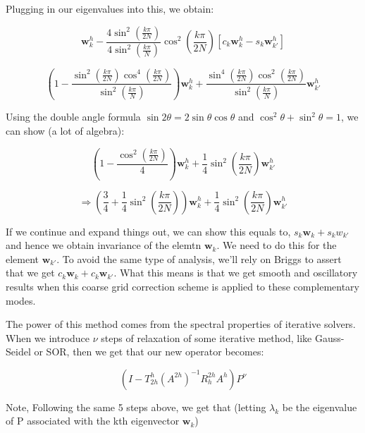 \documentclass[pdftex,12pt,a4paper]{article}
\begin{document}
Plugging in our eigenvalues into this, we obtain: 

\begin{equation}
\mathbf{w}_k^h  - \frac{4 \sin^2 \left( \frac{k \pi}{2N} \right)}{4 \sin^2 \left( \frac{k \pi}{N} \right)} \cos^2\left( \frac{k \pi}{2N}\right) \left[ c_k \mathbf{w}_k^h - s_k \mathbf{w}_{k'}^h \right]
\end{equation}

\begin{equation}
\left(1 - \frac{ \sin^2 \left( \frac{k \pi}{2N} \right) \cos^4\left( \frac{k \pi}{2N}\right) }{ \sin^2 \left( \frac{k \pi}{N} \right)}  \right)\mathbf{w}_k^h  + \frac{ \sin^4 \left( \frac{k \pi}{2N} \right) \cos^2\left( \frac{k \pi}{2N}\right) }{ \sin^2 \left( \frac{k \pi}{N} \right) }  \mathbf{w}_{k'}^h
\end{equation}

Using the double angle formula  $\sin 2 \theta = 2\sin \theta \cos \theta $ and $\cos^2 \theta + \sin^2 \theta = 1$, we can show (a lot of algebra): 

$$
\left( 1 -  \frac{\cos^2 \left( \frac{k \pi}{2N}\right)}{4} \right) \mathbf{w}_k^h + \frac 1 4 \sin^2 \left( \frac{k \pi}{2N} \right) \mathbf{w}_{k'}^h
$$

$$\Rightarrow
\left( \frac 3 4 + \frac 1 4 \sin^2\left( \frac{k \pi}{2N}\right) \right) \mathbf{w}_k^h + \frac 1 4 \sin^2 \left( \frac{k \pi}{2N}\right) \mathbf{w}_{k'}^h
$$

If we continue and expand things out, we can show this equals to, $s_k \mathbf{w}_k + s_k w_{k'}$ and hence we obtain invariance of the elemtn $\mathbf{w}_k$.  We need to do this for the element $\mathbf{w}_{k'}$.  To avoid the same type of analysis, we'll rely on Briggs to assert that we get $c_k \mathbf{w}_k + c_k \mathbf{w}_{k'}$.  What this means is that we get smooth and oscillatory results when this coarse grid correction scheme is applied to these complementary modes.  

The power of this method comes from the spectral properties of iterative solvers.  When we introduce $\nu$ steps of relaxation of some iterative method, like Gauss-Seidel or SOR, then we get that our new operator becomes:

\begin{equation}
\left( I - T_{2h}^h (A^{2h})^{-1} R_h^{2h} A^h \right) P^{\nu}
\end{equation}

Note, 
Following the same 5 steps above, we get that (letting $\lambda_k$ be the eigenvalue of P associated with the kth eigenvector $\mathbf{w}_k$)
\end{document}

